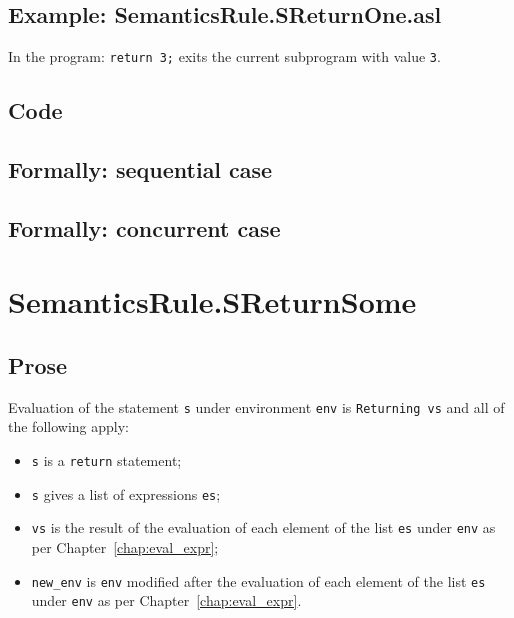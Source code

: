 \documentclass{book}
\begin{document}
    \subsection{Example: SemanticsRule.SReturnOne.asl}
    In the program:
    \texttt{return 3;} exits the current subprogram with value \texttt{3}.

  \subsection{Code}

\begin{emptyformal}
  \subsection{Formally: sequential case}

  \subsection{Formally: concurrent case}
\end{emptyformal}


\section{SemanticsRule.SReturnSome \label{sec:SemanticsRule.SReturnSome}}

    \subsection{Prose}
Evaluation of the statement \texttt{s} under environment \texttt{env} is
\texttt{Returning vs} and all of the following apply:
    \begin{itemize}
    \item \texttt{s} is a \texttt{return} statement;
    \item \texttt{s} gives a list of expressions \texttt{es};
    \item \texttt{vs} is the result of the evaluation of each element of the list \texttt{es} under \texttt{env} as per Chapter~\ref{chap:eval_expr};
    \item \texttt{new\_env} is \texttt{env} modified after the evaluation of each element of the list \texttt{es} under \texttt{env} as per Chapter~\ref{chap:eval_expr}.
    \end{itemize}
\end{document}
